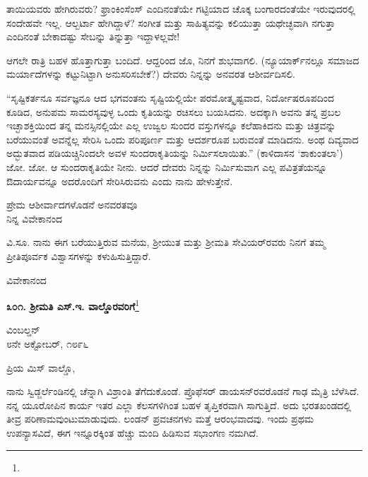 ತಾಯಿಯವರು ಹೇಗಿರುವರು? ಫ್ರಾಂಕಿಂಸೆಂಸ್ ಎಂದಿನಂತೆಯೇ ಗಟ್ಟಿಯಾದ ಚೊಕ್ಕ ಬಂಗಾರದಂತೆಯೇ ಇರುವುದರಲ್ಲಿ ಸಂದೇಹವೇ ಇಲ್ಲ. ಆಲ್ಬರ್ಟಾ ಹೇಗಿದ್ದಾಳೆ? ಸಂಗೀತ ಮತ್ತು ಸಾಹಿತ್ಯವನ್ನು ಕಲಿಯುತ್ತಾ ಯಥೇಚ್ಛವಾಗಿ ನಗುತ್ತಾ ಎಂದಿನಂತೆ ಬೇಕಾದಷ್ಟು ಸೇಬನ್ನು ತಿನ್ನುತ್ತಾ ಇದ್ದಾಳಲ್ಲವೇ!

ಆಗಲೇ ರಾತ್ರಿ ಬಹಳ ಹೊತ್ತಾಗುತ್ತಾ ಬಂದಿದೆ. ಆದ್ದರಿಂದ ಜೊ, ನಿನಗೆ ಶುಭವಾಗಲಿ. (ನ್ಯೂಯಾರ್ಕ್‌ನಲ್ಲೂ ಸಮಾಜದ ಮರ್ಯಾದೆಗಳನ್ನು ಕಟ್ಟುನಿಟ್ಟಾಗಿ ಅನುಸರಿಸಬೇಕೆ?) ದೇವರು ನಿನ್ನನ್ನು ಅನವರತ ಆಶೀರ್ವದಿಸಲಿ.

“ಸೃಷ್ಟಿಕರ್ತನೂ ಸರ್ವಜ್ಞನೂ ಆದ ಭಗವಂತನು ಸೃಷ್ಟಿಯಲ್ಲಿಯೇ ಪರಮೋತ್ಕೃಷ್ಟವಾದ, ನಿರ್ದೋಷರೂಪದಿಂದ ಕೂಡಿದ, ಅನುಪಮ ಸಾಮರಸ್ಯವುಳ್ಳ ಒಂದು ಕೃತಿಯನ್ನು ರಚಿಸಲು ಬಯಸಿದನು. ಅದಕ್ಕಾಗಿ ಅವನು ತನ್ನ ಪ್ರಬಲ ಇಚ್ಛಾಶಕ್ತಿಯಿಂದ ತನ್ನ ಮನಸ್ಸಿನಲ್ಲಿಯೇ ಎಲ್ಲ ಉಜ್ವಲ ಸುಂದರ ವಸ್ತುಗಳನ್ನೂ ಕಲೆಹಾಕಿದನು ಮತ್ತು ಚಿತ್ರವನ್ನು ಬರೆಯುವಂತೆ ಅವನ್ನೆಲ್ಲ ಸೇರಿಸಿ ಒಂದು ಪರಿಪೂರ್ಣ ಮತ್ತು ಆದರ್ಶರೂಪ ಬರುವಂತೆ ಮಾಡಿದನು. ಅಂಥ ದಿವ್ಯವಾದ ಅದ್ಭುತವಾದ ಪಡಿಯಚ್ಚಿನಿಂದಲೇ ಅವಳ ಸುಂದರಾಕೃತಿಯನ್ನು ನಿರ್ಮಿಸಲಾಯಿತು.” (ಕಾಳಿದಾಸನ ‘ಶಾಕುಂತಲಾ’) ಜೋ. ಜೋ. ಆ ಸುಂದರಾಕೃತಿಯೇ ನೀನು. ಆದರೆ ದೇವರು ನಿನ್ನನ್ನು ನಿರ್ಮಿಸುವಾಗ ಎಲ್ಲ ಪವಿತ್ರತೆಯನ್ನೂ ಔದಾರ್ಯವನ್ನೂ ಅದರೊಂದಿಗೆ ಸೇರಿಸಿರುವನು ಎಂದು ನಾನು ಹೇಳುತ್ತೇನೆ.

\begin{flushright}
ಪ್ರೇಮ ಆಶೀರ್ವಾದಗಳೊಡನೆ ಅನವರತವೂ\\ನಿನ್ನ ವಿವೇಕಾನಂದ
\end{flushright}

\newpage

ವಿ.ಸೂ.\enginline{-} ನಾನು ಈಗ ಬರೆಯುತ್ತಿರುವ ಮನೆಯ, ಶ‍್ರೀಯುತ ಮತ್ತು ಶ‍್ರೀಮತಿ ಸೇವಿಯರ್‌ರವರು ನಿನಗೆ ತಮ್ಮ ಪ್ರೀತಿಪೂರ್ವಕ ವಿಶ್ವಾಸಗಳನ್ನು ಕಳುಹಿಸುತ್ತಿದ್ದಾರೆ.

\vspace{0.1cm}

{\flushright
ವಿವೇಕಾನಂದ\par}

\begin{center}
\textbf{೩೦೧. ಶ‍್ರೀಮತಿ ಎಸ್.ಇ. ವಾಲ್ಡೊರವರಿಗೆ}\footnote{}
\end{center}

\begin{flushright}
ವಿಂಬಲ್ಡನ್\\೮ನೇ ಅಕ್ಟೋಬರ್, ೧೮೯೬
\end{flushright}

\noindent
ಪ್ರಿಯ ಮಿಸ್‌ ವಾಲ್ಡೊ,

\vspace{0.1cm}

ನಾನು ಸ್ವಿಡ್ಜರ್ಲೆಂಡಿನಲ್ಲಿ ಚೆನ್ನಾಗಿ ವಿಶ್ರಾಂತಿ ತೆಗೆದುಕೊಂಡೆ. ಪ್ರೊಫೆಸರ್ ಡಾಯಸನ್‌ರವರೊಡನೆ ಗಾಢ ಮೈತ್ರಿ ಬೆಳೆಸಿದೆ. ನನ್ನ ಯೂರೋಪಿನ ಕಾರ್ಯ ಇತರ ಎಲ್ಲಾ ಕೆಲಸಗಳಿಗಿಂತ ಬಹಳ ತೃಪ್ತಿಕರವಾಗಿ ಸಾಗುತ್ತಿದೆ. ಅದು ಭರತಖಂಡದಲ್ಲಿ ತೀವ್ರ ಪರಿಣಾಮವುಂಟುಮಾಡುವುದು. ಲಂಡನ್ ಪ್ರವಚನಗಳು ಮತ್ತೆ ಆರಂಭವಾದವು. ಇಂದು ಪ್ರಥಮ ಉಪನ್ಯಾಸವಿದೆ, ಈಗ ಇನ್ನೂರಕ್ಕಿಂತ ಹೆಚ್ಚು ಮಂದಿ ಹಿಡಿಸುವ ಸಭಾಂಗಣ ನಮಗಿದೆ.

